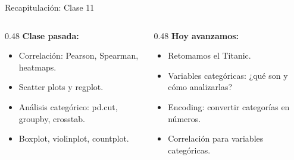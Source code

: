\documentclass[aspectratio=169, 11pt]{beamer}
\begin{document}
\begin{frame}[shrink=5]{Recapitulación: Clase 11}
  \vspace{-4pt}
  \begin{columns}[T]
    \begin{column}{0.48\textwidth}
      {\footnotesize\bfseries\color{arcaDark} Clase pasada:}
      \vspace{4pt}

      {\footnotesize
      \begin{itemize}\setlength{\itemsep}{4pt}
        \item[{\color{codeGreen}\faCheckCircle}]
          Correlación: Pearson, Spearman, heatmaps.
        \item[{\color{codeGreen}\faCheckCircle}]
          Scatter plots y regplot.
        \item[{\color{codeGreen}\faCheckCircle}]
          Análisis categórico: pd.cut, groupby, crosstab.
        \item[{\color{codeGreen}\faCheckCircle}]
          Boxplot, violinplot, countplot.
      \end{itemize}
      }
    \end{column}

    \begin{column}{0.48\textwidth}
      {\footnotesize\bfseries\color{arcaRed} Hoy avanzamos:}
      \vspace{4pt}

      {\footnotesize
      \begin{itemize}\setlength{\itemsep}{4pt}
        \item[{\color{arcaRed}\faArrowRight}]
          Retomamos el Titanic.
        \item[{\color{arcaRed}\faArrowRight}]
          Variables categóricas: ¿qué son y cómo analizarlas?
        \item[{\color{arcaRed}\faArrowRight}]
          Encoding: convertir categorías en números.
        \item[{\color{arcaRed}\faArrowRight}]
          Correlación para variables categóricas.
      \end{itemize}
      }
    \end{column}
  \end{columns}
\end{frame}
\end{document}
